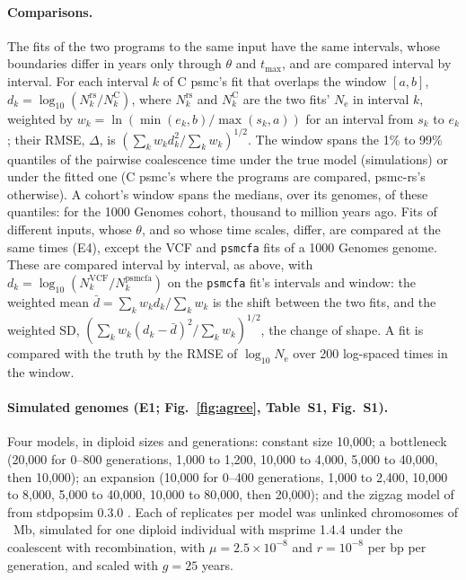 \documentclass[11pt]{article}
\newcommand{\psmcrs}{psmc-rs}
\newcommand{\Ne}{\ensuremath{N_\mathrm{e}}}
\begin{document}
\paragraph{Comparisons.} The fits of the two programs to the same input have the same intervals, whose boundaries differ in years only through $\theta$ and $t_{\max}$, and are compared interval by interval. For each interval $k$ of C psmc's fit that overlaps the window $[a,b]$, $d_k=\log_{10}(N^{\text{rs}}_k/N^{\text{C}}_k)$, where $N^{\text{rs}}_k$ and $N^{\text{C}}_k$ are the two fits' \Ne{} in interval $k$, weighted by $w_k=\ln(\min(e_k,b)/\max(s_k,a))$ for an interval from $s_k$ to $e_k$; their RMSE, $\Delta$, is $(\sum_kw_kd_k^2/\sum_kw_k)^{1/2}$. The window spans the 1\% to 99\% quantiles of the pairwise coalescence time under the true model (simulations) or under the fitted one (C psmc's where the programs are compared, \psmcrs{}'s otherwise). A cohort's window spans the medians, over its genomes, of these quantiles: for the 1000 Genomes cohort, \EsevenWindowLoKy{} thousand to \EsevenWindowHiMy{} million years ago. Fits of different inputs, whose $\theta$, and so whose time scales, differ, are compared at the same times (E4), except the VCF and \texttt{psmcfa} fits of a 1000 Genomes genome. These are compared interval by interval, as above, with $d_k=\log_{10}(N^{\text{VCF}}_k/N^{\text{psmcfa}}_k)$ on the \texttt{psmcfa} fit's intervals and window: the weighted mean $\bar d=\sum_kw_kd_k/\sum_kw_k$ is the shift between the two fits, and the weighted SD, $(\sum_kw_k(d_k-\bar d)^2/\sum_kw_k)^{1/2}$, the change of shape. A fit is compared with the truth by the RMSE of $\log_{10}\Ne$ over 200 log-spaced times in the window.

\paragraph{Simulated genomes (E1; Fig.~\ref{fig:agree}, Table~S1, Fig.~S1).} Four models, in diploid sizes and generations: constant size 10,000; a bottleneck (20,000 for 0--800 generations, 1,000 to 1,200, 10,000 to 4,000, 5,000 to 40,000, then 10,000); an expansion (10,000 for 0--400 generations, 1,000 to 2,400, 10,000 to 8,000, 5,000 to 40,000, 10,000 to 80,000, then 20,000); and the zigzag model of \citet{schiffels2014} from stdpopsim 0.3.0 \citep{adrion2020}. Each of \EoneReps{} replicates per model was \EoneChroms{} unlinked chromosomes of \EoneChromMb{}~Mb, simulated for one diploid individual with msprime 1.4.4 \citep{kelleher2016,baumdicker2022} under the coalescent with recombination, with $\mu=2.5\times10^{-8}$ and $r=10^{-8}$ per bp per generation, and scaled with $g=25$ years.
\end{document}
